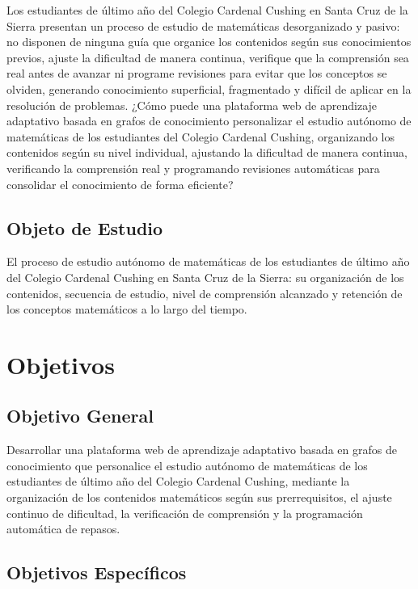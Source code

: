 \documentclass{univalle-perfil}
\begin{document}
Los estudiantes de último año del Colegio Cardenal Cushing en Santa Cruz de la Sierra presentan un proceso de estudio de matemáticas desorganizado y pasivo: no disponen de ninguna guía que organice los contenidos según sus conocimientos previos, ajuste la dificultad de manera continua, verifique que la comprensión sea real antes de avanzar ni programe revisiones para evitar que los conceptos se olviden, generando conocimiento superficial, fragmentado y difícil de aplicar en la resolución de problemas. ¿Cómo puede una plataforma web de aprendizaje adaptativo basada en grafos de conocimiento personalizar el estudio autónomo de matemáticas de los estudiantes del Colegio Cardenal Cushing, organizando los contenidos según su nivel individual, ajustando la dificultad de manera continua, verificando la comprensión real y programando revisiones automáticas para consolidar el conocimiento de forma eficiente?

\subsection{Objeto de Estudio}

El proceso de estudio autónomo de matemáticas de los estudiantes de último año del Colegio Cardenal Cushing en Santa Cruz de la Sierra: su organización de los contenidos, secuencia de estudio, nivel de comprensión alcanzado y retención de los conceptos matemáticos a lo largo del tiempo.

\section{Objetivos}

\subsection{Objetivo General}

Desarrollar una plataforma web de aprendizaje adaptativo basada en grafos de conocimiento que personalice el estudio autónomo de matemáticas de los estudiantes de último año del Colegio Cardenal Cushing, mediante la organización de los contenidos matemáticos según sus prerrequisitos, el ajuste continuo de dificultad, la verificación de comprensión y la programación automática de repasos.

\subsection{Objetivos Específicos}
\end{document}
